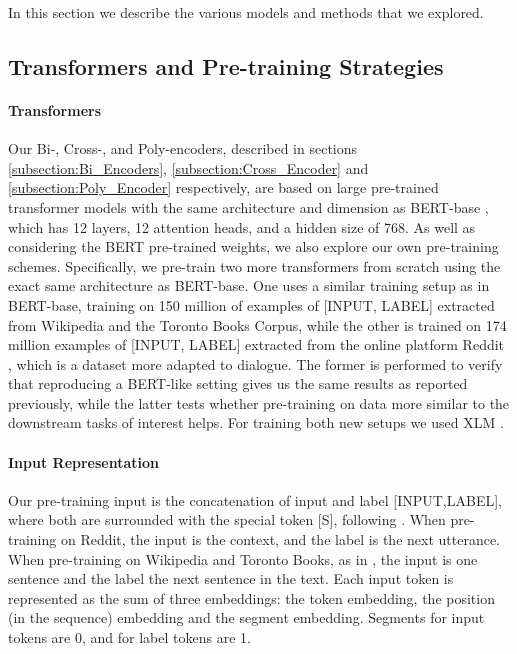 \documentclass{article} \usepackage{iclr2020_conference,times}
\begin{document}
In this section we describe the various models and methods that we explored.
















\subsection{Transformers and Pre-training Strategies}
\paragraph{Transformers}
Our Bi-, Cross-, and Poly-encoders, described in sections \ref{subsection:Bi_Encoders}, \ref{subsection:Cross_Encoder} and \ref{subsection:Poly_Encoder} respectively, are based on large pre-trained transformer models with the same architecture and dimension as BERT-base \citep{devlin-etal-2019-bert}, which has 12 layers, 12 attention heads, and a hidden size of 768. As well as considering the BERT pre-trained weights, we also explore our own pre-training schemes. Specifically, we pre-train two more transformers from scratch using the exact same architecture as BERT-base. One uses a similar training
setup as in BERT-base, training on 150 million of examples of [INPUT, LABEL] extracted from Wikipedia and the Toronto Books Corpus,  while the other is trained on  174 million  examples of [INPUT, LABEL] extracted from the online platform Reddit \citep{training_millions}, which is a dataset more adapted to dialogue. 
The former is performed to verify that reproducing a BERT-like setting gives us the same results as reported previously, while the latter tests whether pre-training on data
more similar to the downstream tasks of interest helps.
For training both new setups we used  XLM  \citep{lample2019cross}.


\paragraph{Input Representation}

Our pre-training input is the concatenation of input and label [INPUT,LABEL], 
where both are surrounded with the special token [S], 
following \citet{lample2019cross}. 
When pre-training on Reddit, the input is the context,
and the label is the next utterance. When pre-training on Wikipedia and Toronto Books, as in \citet{devlin-etal-2019-bert}, the input is one sentence and the label the next sentence in the text. 
Each input token is represented as the sum of three embeddings: the token embedding, the position (in the sequence) embedding and the segment embedding.
Segments for input tokens are 0, and for label tokens are 1.
\end{document}
